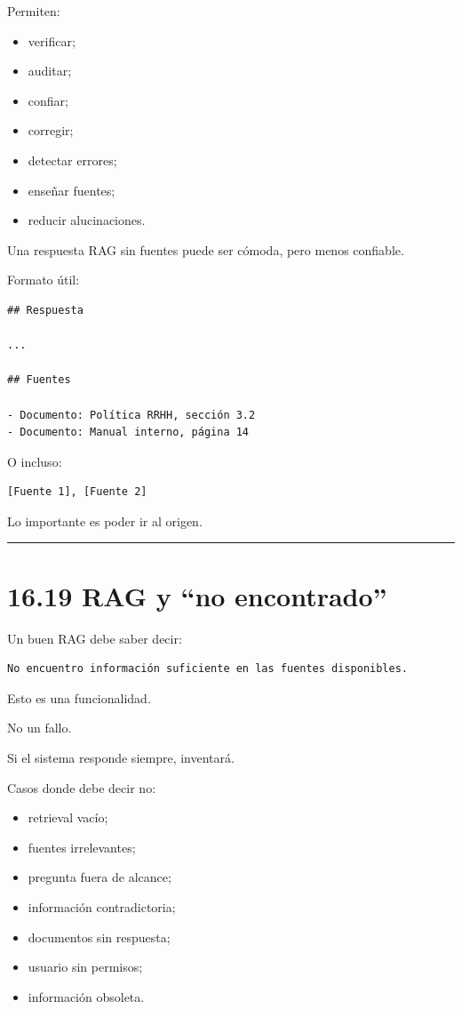 Permiten:

\begin{itemize}
\tightlist
\item
  verificar;
\item
  auditar;
\item
  confiar;
\item
  corregir;
\item
  detectar errores;
\item
  enseñar fuentes;
\item
  reducir alucinaciones.
\end{itemize}

Una respuesta RAG sin fuentes puede ser cómoda, pero menos confiable.

Formato útil:

\begin{lstlisting}
## Respuesta

...

## Fuentes

- Documento: Política RRHH, sección 3.2
- Documento: Manual interno, página 14
\end{lstlisting}

O incluso:

\begin{lstlisting}
[Fuente 1], [Fuente 2]
\end{lstlisting}

Lo importante es poder ir al origen.

\begin{center}\rule{0.5\linewidth}{0.5pt}\end{center}

\section{16.19 RAG y ``no encontrado''}\label{rag-y-no-encontrado}

Un buen RAG debe saber decir:

\begin{lstlisting}
No encuentro información suficiente en las fuentes disponibles.
\end{lstlisting}

Esto es una funcionalidad.

No un fallo.

Si el sistema responde siempre, inventará.

Casos donde debe decir no:

\begin{itemize}
\tightlist
\item
  retrieval vacío;
\item
  fuentes irrelevantes;
\item
  pregunta fuera de alcance;
\item
  información contradictoria;
\item
  documentos sin respuesta;
\item
  usuario sin permisos;
\item
  información obsoleta.
\end{itemize}

